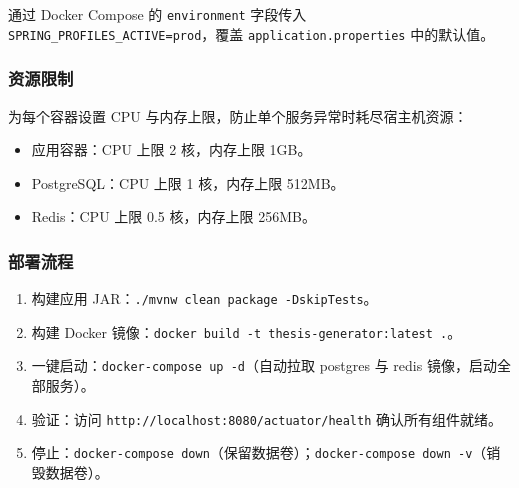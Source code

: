 \documentclass{../softeng}
\begin{document}
通过 Docker Compose 的 \texttt{environment} 字段传入 \texttt{SPRING\_PROFILES\_ACTIVE=prod}，覆盖 \texttt{application.properties} 中的默认值。

\subsubsection{资源限制}

为每个容器设置 CPU 与内存上限，防止单个服务异常时耗尽宿主机资源：

\begin{itemize}
    \item 应用容器：CPU 上限 2 核，内存上限 1GB。
    \item PostgreSQL：CPU 上限 1 核，内存上限 512MB。
    \item Redis：CPU 上限 0.5 核，内存上限 256MB。
\end{itemize}

\subsubsection{部署流程}

\begin{enumerate}
    \item 构建应用 JAR：\texttt{./mvnw clean package -DskipTests}。
    \item 构建 Docker 镜像：\texttt{docker build -t thesis-generator:latest .}。
    \item 一键启动：\texttt{docker-compose up -d}（自动拉取 postgres 与 redis 镜像，启动全部服务）。
    \item 验证：访问 \texttt{http://localhost:8080/actuator/health} 确认所有组件就绪。
    \item 停止：\texttt{docker-compose down}（保留数据卷）；\texttt{docker-compose down -v}（销毁数据卷）。
\end{enumerate}
\end{document}

